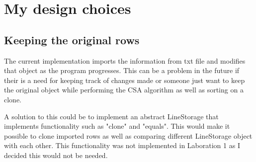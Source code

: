 \section{My design choices}
\subsection{Keeping the original rows}
The current implementation imports the information from txt file and modifies
that object as the program progresses. This can be a problem in the future
if their is a need for keeping track of changes made or someone just want to keep
the original object while performing the CSA algorithm as well as sorting on a
clone.

A solution to this could be to implement an abstract LineStorage that implements
functionality such as "clone" and "equals". This would make it possible to clone
imported rows as well as comparing different LineStorage object with each other.
This functionality was not implemented in Laboration 1 as I decided this would not
be needed.
